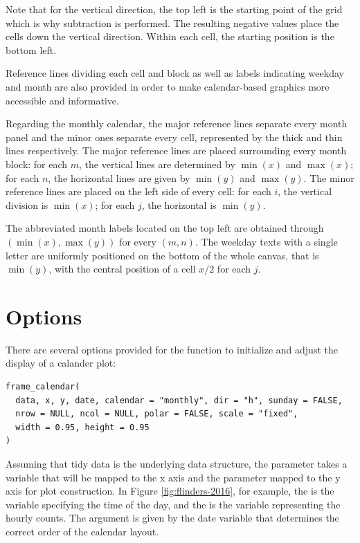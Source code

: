 \documentclass[article]{jss}
\begin{document}
Note that for the vertical direction, the top left is the starting point
of the grid which is why subtraction is performed. The resulting
negative values place the cells down the vertical direction. Within each
cell, the starting position is the bottom left.

Reference lines dividing each cell and block as well as labels
indicating weekday and month are also provided in order to make
calendar-based graphics more accessible and informative.

Regarding the monthly calendar, the major reference lines separate every
month panel and the minor ones separate every cell, represented by the
thick and thin lines respectively. The major reference lines are placed
surrounding every month block: for each \(m\), the vertical lines are
determined by \(\min{(x)}\) and \(\max{(x)}\); for each \(n\), the
horizontal lines are given by \(\min{(y)}\) and \(\max{(y)}\). The minor
reference lines are placed on the left side of every cell: for each
\(i\), the vertical division is \(\min{(x)}\); for each \(j\), the
horizontal is \(\min{(y)}\).

The abbreviated month labels located on the top left are obtained
through \((\min{(x)}, \max{(y)})\) for every \((m, n)\). The weekday
texts with a single letter are uniformly positioned on the bottom of the
whole canvas, that is \(\min{(y)}\), with the central position of a cell
\(x / 2\) for each \(j\).

\section{Options}\label{options}

\label{sec:opt}

There are several options provided for the 
function to initialize and adjust the display of a calander plot:

\begin{verbatim}
frame_calendar(
  data, x, y, date, calendar = "monthly", dir = "h", sunday = FALSE, 
  nrow = NULL, ncol = NULL, polar = FALSE, scale = "fixed",
  width = 0.95, height = 0.95
)
\end{verbatim}

Assuming that tidy data \citep{wickham2014tidy} is the underlying data
structure, the parameter  takes a variable that will be mapped
to the x axis and the parameter  mapped to the y axis for plot
construction. In Figure \ref{fig:flinders-2016}, for example, the
 is the variable specifying the time of the day, and the
 is the variable representing the hourly counts. The 
argument is given by the date variable that determines the correct order
of the calendar layout.
\end{document}

